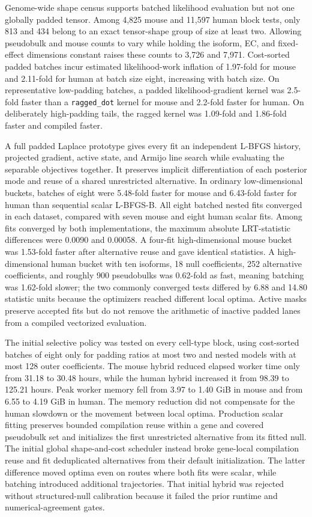 \documentclass[11pt]{article}
\begin{document}
Genome-wide shape census supports batched likelihood evaluation but not one globally padded tensor. Among 4,825 mouse and 11,597 human block tests, only 813 and 434 belong to an exact tensor-shape group of size at least two. Allowing pseudobulk and mouse counts to vary while holding the isoform, EC, and fixed-effect dimensions constant raises these counts to 3,726 and 7,971. Cost-sorted padded batches incur estimated likelihood-work inflation of 1.97-fold for mouse and 2.11-fold for human at batch size eight, increasing with batch size. On representative low-padding batches, a padded likelihood-gradient kernel was 2.5-fold faster than a \texttt{ragged\_dot} kernel for mouse and 2.2-fold faster for human. On deliberately high-padding tails, the ragged kernel was 1.09-fold and 1.86-fold faster and compiled faster.

A full padded Laplace prototype gives every fit an independent L-BFGS history, projected gradient, active state, and Armijo line search while evaluating the separable objectives together. It preserves implicit differentiation of each posterior mode and reuse of a shared unrestricted alternative. In ordinary low-dimensional buckets, batches of eight were 5.48-fold faster for mouse and 6.43-fold faster for human than sequential scalar L-BFGS-B. All eight batched nested fits converged in each dataset, compared with seven mouse and eight human scalar fits. Among fits converged by both implementations, the maximum absolute LRT-statistic differences were 0.0090 and 0.00058. A four-fit high-dimensional mouse bucket was 1.53-fold faster after alternative reuse and gave identical statistics. A high-dimensional human bucket with ten isoforms, 18 null coefficients, 252 alternative coefficients, and roughly 900 pseudobulks was 0.62-fold as fast, meaning batching was 1.62-fold slower; the two commonly converged tests differed by 6.88 and 14.80 statistic units because the optimizers reached different local optima. Active masks preserve accepted fits but do not remove the arithmetic of inactive padded lanes from a compiled vectorized evaluation.

The initial selective policy was tested on every cell-type block, using cost-sorted batches of eight only for padding ratios at most two and nested models with at most 128 outer coefficients. The mouse hybrid reduced elapsed worker time only from 31.18 to 30.48 hours, while the human hybrid increased it from 98.39 to 125.21 hours. Peak worker memory fell from 3.97 to 1.40 GiB in mouse and from 6.55 to 4.19 GiB in human. The memory reduction did not compensate for the human slowdown or the movement between local optima. Production scalar fitting preserves bounded compilation reuse within a gene and covered pseudobulk set and initializes the first unrestricted alternative from its fitted null. The initial global shape-and-cost scheduler instead broke gene-local compilation reuse and fit deduplicated alternatives from their default initialization. The latter difference moved optima even on routes where both fits were scalar, while batching introduced additional trajectories. That initial hybrid was rejected without structured-null calibration because it failed the prior runtime and numerical-agreement gates.
\end{document}
